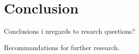 
\chapter{Conclusion}

Conclusions i nregards to resarch questions? 

Recommandations for further research.

\cleardoublepage